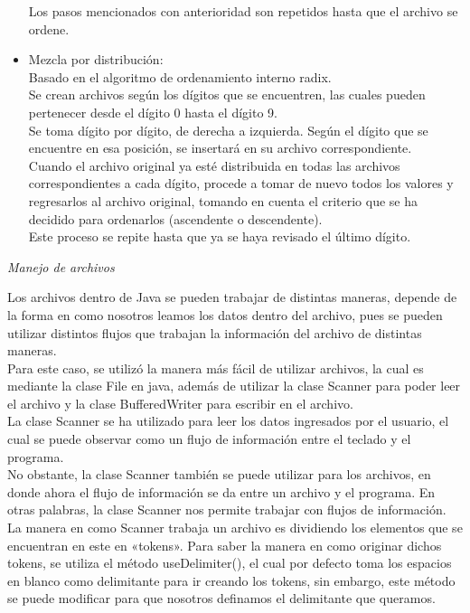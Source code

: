 \documentclass[12pt,letterpaper]{article}
\begin{document}
\begin{large}
\begin{itemize}
\begin{enumerate}[noitemsep,topsep=0pt]
\end{enumerate}
Los pasos mencionados con anterioridad son repetidos hasta que el archivo se ordene.
\item Mezcla por distribución: \\
Basado en el algoritmo de ordenamiento interno radix. \\
Se crean archivos según los dígitos que se encuentren, las cuales pueden pertenecer desde el dígito 0 hasta el dígito 9. \\
Se toma dígito por dígito, de derecha a izquierda. Según el dígito que se encuentre en esa posición, se insertará en su archivo correspondiente. \\ Cuando el archivo original ya esté distribuida en todas las archivos correspondientes a cada dígito, procede a tomar de nuevo todos los valores y regresarlos al archivo original, tomando en cuenta el criterio que se ha decidido para ordenarlos (ascendente o descendente).\\
Este proceso se repite hasta que ya se haya revisado el último dígito. 
\end{itemize}
\noindent\textit{Manejo de archivos}\par
Los archivos dentro de Java se pueden trabajar de distintas maneras, depende de la forma en como nosotros leamos los datos dentro del archivo, pues se pueden utilizar distintos flujos que trabajan la información del archivo de distintas maneras.\\
Para este caso, se utilizó la manera más fácil de utilizar archivos, la cual es mediante la clase File en java, además de utilizar la clase Scanner para poder leer el  archivo y la clase BufferedWriter para escribir en el archivo.\\
La clase Scanner se ha utilizado para leer los datos ingresados por el usuario, el cual se puede observar como un flujo de información entre el teclado y el programa.\\
No obstante, la clase Scanner también se puede utilizar para los archivos, en donde ahora el flujo de información se da entre un archivo y el programa. En otras palabras, la clase Scanner nos permite trabajar con flujos de información. La manera en como Scanner trabaja un archivo es dividiendo los elementos que se encuentran en este en «tokens». Para saber la manera en como originar dichos tokens, se utiliza el método useDelimiter(), el cual por defecto toma los espacios en blanco como delimitante para ir creando los tokens, sin embargo, este método se puede modificar para que nosotros definamos el delimitante que queramos.\\

\end{large}
\end{document}
